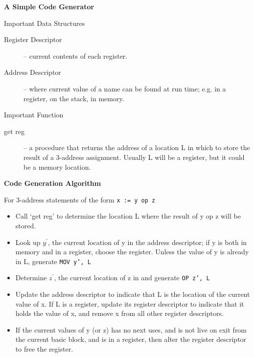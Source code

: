 %
%
\begin{slide}{}
{\bf A Simple Code Generator}

Important Data Structures
\begin{description}
\item[Register Descriptor] -- current contents of each register.
\item[Address Descriptor] -- where current value of a name can be
    found at run time; e.g. in a register, on the stack, in memory.
\end{description}

Important Function
\begin{description}
\item[get reg] -- a procedure that returns
    the address of a 
    location L in which to store the result of a
    3-address assignment.
    Usually L will be a register, but it could
    be a memory location.
\end{description}     

\end{slide}
%
%
\begin{slide}{}
{\small
{\bf Code Generation Algorithm}

For 3-address statements of the form
{\tt x := y op z}

\begin{itemize}                     
\item Call `get reg' to determine the location L
  where the result of y op z will be stored.

\item Look up
   $y^\prime $, the current location of y in the address descriptor;
  if y is both in memory and in a
  register, choose the register. Unless the
  value of y is already in L, generate {\tt MOV y', L}

\item  Determine $z^\prime$, the current location of z in
   and generate {\tt OP z', L}

\item  Update the address descriptor to indicate
  that L is the location of the current
  value of x.  If L is a register, update
  its register descriptor to indicate that
  it holds the value of x, and remove x from
  all other register descriptors.

\item   If the current values of y (or z) has no
  next uses, and is not live on exit from
  the current basic block, and is in a
  register, then alter the register
  descriptor to free the register.
\end{itemize}
}
\end{slide}
